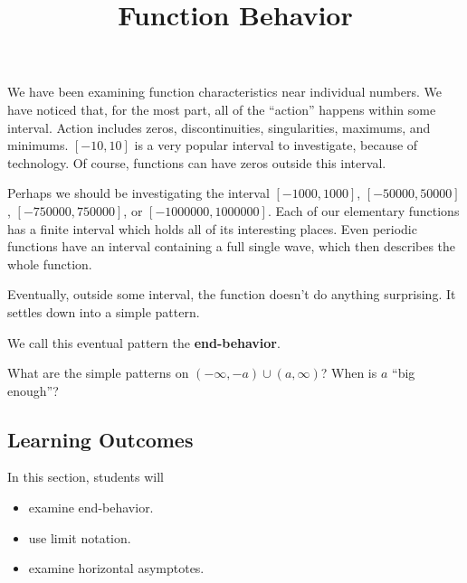 \documentclass{ximera}
\title{Function Behavior}
\begin{document}
\begin{abstract}
\end{abstract}
\maketitle




We have been examining function characteristics near individual numbers. We have noticed that, for the most part, all of the ``action'' happens within some interval.  Action includes zeros, discontinuities, singularities, maximums, and minimums.  $[-10, 10]$  is a very popular interval to investigate, because of technology.  Of course, functions can have zeros outside this interval.  

Perhaps we should be investigating the interval $[-1000, 1000]$, $[-50000, 50000]$, $[-750000, 750000]$, or $[-1000000, 1000000]$. Each of our elementary functions has a finite interval which holds all of its interesting places.  Even periodic functions have an interval containing a full single wave, which then describes the whole function.

Eventually, outside some interval, the function doesn't do anything surprising.  It settles down into a simple pattern.  

We call this eventual pattern the \textbf{\textcolor{purple!85!blue}{end-behavior}}.



What are the simple patterns on $(-\infty, -a) \cup (a, \infty)$?  When is $a$ ``big enough''?








\subsection*{Learning Outcomes}


\begin{sectionOutcomes}
In this section, students will 

\begin{itemize}
\item examine end-behavior.
\item use limit notation.
\item examine horizontal asymptotes.
\end{itemize}
\end{sectionOutcomes}
\end{document}
